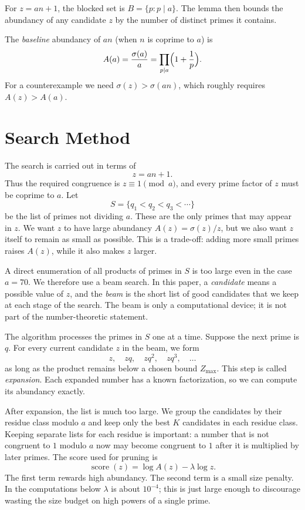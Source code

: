 \documentclass[12pt]{amsart}
\theoremstyle{definition}
\begin{document}
For $z = an+1$, the blocked set is $B = \{p : p \mid a\}$.  The lemma then
bounds the abundancy of any candidate $z$ by the number of distinct primes it
contains.

The \emph{baseline} abundancy of $an$ (when $n$ is coprime to $a$) is
\[
A(a) = \frac{\sigma(a)}{a} = \prod_{p \mid a} \Bigl(1 + \frac{1}{p}\Bigr).
\]
For a counterexample we need $\sigma(z) > \sigma(an)$, which roughly requires
$A(z) > A(a)$.

\section{Search Method}

The search is carried out in terms of
\[
z = an+1.
\]
Thus the required congruence is $z \equiv 1 \pmod a$, and every prime factor
of $z$ must be coprime to $a$.  Let
\[
S = \{q_1 < q_2 < q_3 < \cdots\}
\]
be the list of primes not dividing $a$.  These are the only primes that may
appear in $z$.  We want $z$ to have large abundancy
$A(z)=\sigma(z)/z$, but we also want $z$ itself to remain as small as possible.
This is a trade-off: adding more small primes raises $A(z)$, while it also
makes $z$ larger.

A direct enumeration of all products of primes in $S$ is too large even in the
case $a=70$.  We therefore use a beam search.  In this paper, a \emph{candidate}
means a possible value of $z$, and the \emph{beam} is the short list of good
candidates that we keep at each stage of the search.  The beam is only a
computational device; it is not part of the number-theoretic statement.

The algorithm processes the primes in $S$ one at a time.  Suppose the next
prime is $q$.  For every current candidate $z$ in the beam, we form
\[
z,
\quad zq,
\quad zq^2,
\quad zq^3,
\quad \ldots
\]
as long as the product remains below a chosen bound $Z_{\max}$.  This step is
called \emph{expansion}.  Each expanded number has a known factorization, so
we can compute its abundancy exactly.

After expansion, the list is much too large.  We group the candidates by their
residue class modulo $a$ and keep only the best $K$ candidates in each residue
class.  Keeping separate lists for each residue is important: a number that is
not congruent to $1$ modulo $a$ now may become congruent to $1$ after it is
multiplied by later primes.  The score used for pruning is
\[
\operatorname{score}(z) = \log A(z) - \lambda \log z.
\]
The first term rewards high abundancy.  The second term is a small size
penalty.  In the computations below $\lambda$ is about $10^{-4}$; this is just
large enough to discourage wasting the size budget on high powers of a single
prime.
\end{document}
